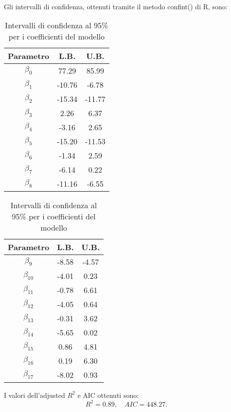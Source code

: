 Gli intervalli di confidenza, ottenuti tramite il metodo confint() di R, sono:
\begin{table}[H]
	\centering
	\begin{minipage}{0.48\linewidth}
		\centering
		\begin{tabular}{|c|c|c|}
			\hline
			\textbf{Parametro} & \textbf{L.B.} & \textbf{U.B.} \\
			\hline
			$\beta_0$   & 77.29  & 85.99 \\
			$\beta_1$   & -10.76 & -6.78 \\
			$\beta_2$   & -15.34 & -11.77 \\
			$\beta_3$   & 2.26   & 6.37 \\
			$\beta_4$   & -3.16  & 2.65 \\
			$\beta_5$   & -15.20 & -11.53 \\
			$\beta_6$   & -1.34  & 2.59 \\
			$\beta_7$   & -6.14  & 0.22 \\
			$\beta_8$   & -11.16 & -6.55 \\
			\hline
		\end{tabular}
	\end{minipage}
	\hfill
	\begin{minipage}{0.48\linewidth}
		\centering
		\begin{tabular}{|c|c|c|}
			\hline
			\textbf{Parametro} & \textbf{L.B.} & \textbf{U.B.} \\
			\hline
			
			$\beta_9$   & -8.58  & -4.57 \\
			$\beta_{10}$ & -4.01  & 0.23 \\
			$\beta_{11}$ & -0.78  & 6.61 \\
			$\beta_{12}$ & -4.05  & 0.64 \\
			$\beta_{13}$ & -0.31  & 3.62 \\
			$\beta_{14}$ & -5.65  & 0.02 \\
			$\beta_{15}$ & 0.86   & 4.81 \\
			$\beta_{16}$ & 0.19   & 6.30 \\
			$\beta_{17}$ & -8.02  & 0.93 \\
			\hline
		\end{tabular}
	\end{minipage}
	\caption{Intervalli di confidenza al 95\% per i coefficienti del modello}
	\label{tab:ci_coefficienti}
\end{table}
I valori dell'adjusted $R^2$  e AIC ottenuti sono:
\begin{equation*}
	R^2 =      0.89, \quad AIC=448.27.
\end{equation*}

